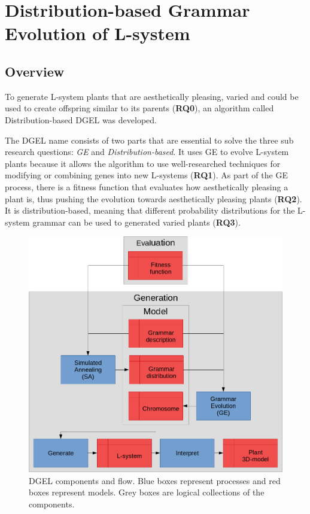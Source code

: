 \chapter{Distribution-based Grammar Evolution of L-system}


\section{Overview}
\label{sec:overview}
To generate \gls{L-system} plants that are aesthetically pleasing, varied and could be used to create offspring similar to its parents (\textbf{RQ0}), an algorithm called Distribution-based \gls{DGEL} was developed.

The \gls{DGEL} name consists of two parts that are essential to solve the three sub research questions: \textit{\gls{GE}} and \textit{Distribution-based}.
It uses \gls{GE} to evolve \gls{L-system} plants because it allows the algorithm to use well-researched techniques for modifying or combining genes into new \glspl{L-system} (\textbf{RQ1}).
As part of the \gls{GE} process, there is a fitness function that evaluates how aesthetically pleasing a plant is, thus pushing the evolution towards aesthetically pleasing plants (\textbf{RQ2}).
It is distribution-based, meaning that different probability distributions for the \gls{L-system} grammar can be used to generated varied plants (\textbf{RQ3}).

\begin{figure}
    \centering
    \includegraphics[width=1.0\textwidth]{figures/dgel}
    \caption[DGEL components and flow]{\gls{DGEL} components and flow. Blue boxes represent processes and red boxes represent models. Grey boxes are logical collections of the components.}
    \label{fig:dgel}
\end{figure}

